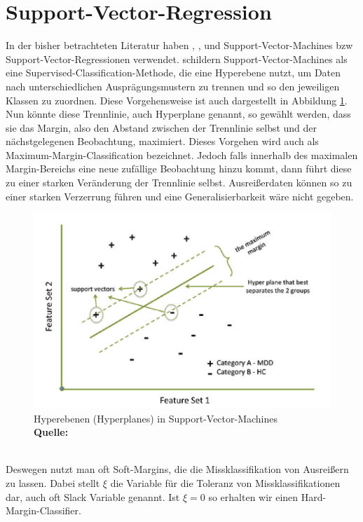 \documentclass[a4paper,12pt]{thesis}
\newcommand*{\captionsource}[2]{%
	\caption[{#1}]{%
		#1%
		\\\hspace{\linewidth}%
		\textbf{Quelle:} #2%
	}%
}
\begin{document}
\section{Support-Vector-Regression}


In der bisher betrachteten Literatur haben \cite{Holmgren2017}, \cite{Broucke2019}, \cite{Xu2013} und \cite{Gao2022} Support-Vector-Machines bzw Support-Vector-Regressionen verwendet. \cite{Pisner2020} schildern Support-Vector-Machines als eine Supervised-Classification-Methode, die eine Hyperebene nutzt, um Daten nach unterschiedlichen Ausprägungsmustern zu trennen und so den jeweiligen Klassen zu zuordnen. Diese Vorgehensweise ist auch dargestellt in Abbildung \ref{SVM}. Nun könnte diese Trennlinie, auch Hyperplane genannt, so gewählt werden, dass sie das Margin, also den Abstand zwischen der Trennlinie selbst und der nächstgelegenen Beobachtung, maximiert. Dieses Vorgehen wird auch als Maximum-Margin-Classification bezeichnet. Jedoch falls innerhalb des maximalen Margin-Bereichs eine neue zufällige Beobachtung hinzu kommt, dann führt diese zu einer starken Veränderung der Trennlinie selbst. Ausreißerdaten können so zu einer starken Verzerrung führen und eine Generalisierbarkeit wäre nicht gegeben.
\begin{figure}[!ht]
	\centering
	\includegraphics[width=\textwidth]{Plots/SVM.png}
	\captionsource{Hyperebenen (Hyperplanes) in Support-Vector-Machines}{
		\cite{Pisner2020}
	}
	\label{SVM}
\end{figure}\\
Deswegen nutzt man oft Soft-Margins, die die Missklassifikation von Ausreißern zu lassen. Dabei stellt $\xi$ die Variable für die Toleranz von Missklassifikationen dar, auch oft Slack Variable genannt. Ist $\xi=0$ so erhalten wir einen Hard-Margin-Classifier.
\end{document}
